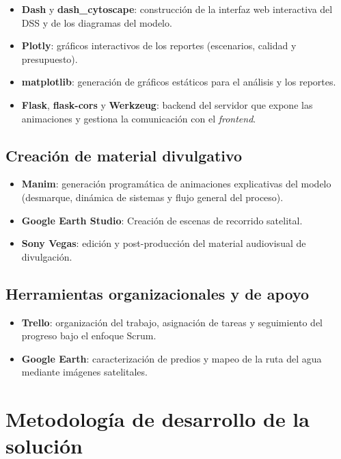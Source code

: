 \documentclass[12pt]{report}
\begin{document}
\begin{itemize}
    \item \textbf{Dash} y \textbf{dash\_cytoscape}: construcción de la interfaz web interactiva del DSS y de los diagramas del modelo.
    \item \textbf{Plotly}: gráficos interactivos de los reportes (escenarios, calidad y presupuesto).
    \item \textbf{matplotlib}: generación de gráficos estáticos para el análisis y los reportes.
    \item \textbf{Flask}, \textbf{flask-cors} y \textbf{Werkzeug}: backend del servidor que expone las animaciones y gestiona la comunicación con el \textit{frontend}.
\end{itemize}

\subsection*{Creación de material divulgativo}

\begin{itemize}
    \item \textbf{Manim}: generación programática de animaciones explicativas del modelo (desmarque, dinámica de sistemas y flujo general del proceso).
    \item \textbf{Google Earth Studio}: Creación de escenas de recorrido satelital.  
    \item \textbf{Sony Vegas}: edición y post-producción del material audiovisual de divulgación. 
    
\end{itemize}

\subsection*{Herramientas organizacionales y de apoyo}

\begin{itemize}
    \item \textbf{Trello}: organización del trabajo, asignación de tareas y seguimiento del progreso bajo el enfoque Scrum.
    \item \textbf{Google Earth}: caracterización de predios y mapeo de la ruta del agua mediante imágenes satelitales.
\end{itemize}


\section{Metodología de desarrollo de la solución}
\end{document}
